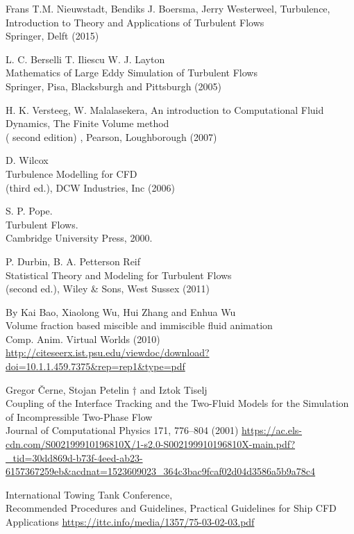 \documentclass[a4paper, 12pt]{report}
\begin{document}
\begin{thebibliography}{9}
	Frans T.M. Nieuwstadt, Bendiks J. Boersma, Jerry Westerweel,
	Turbulence, Introduction to Theory and Applications
of Turbulent Flows \\
	 Springer, Delft (2015)
	 
     L. C. Berselli T. Iliescu W. J. Layton\\	 
	 Mathematics of Large Eddy Simulation of Turbulent Flows \\
	 Springer, Pisa, Blacksburgh and Pittsburgh (2005)	 
	 
	H. K. Versteeg, W. Malalasekera, An introduction to Computational Fluid Dynamics, The Finite Volume method\\
	 ( second edition) , Pearson, Loughborough (2007)
	 
	 D. Wilcox\\
	 Turbulence Modelling for CFD\\
	(third ed.), DCW Industries, Inc (2006)
	
	S. P. Pope.\\
	Turbulent Flows.\\
	Cambridge University Press, 2000.

	 P. Durbin, B. A. Petterson Reif\\
	 Statistical Theory and Modeling for Turbulent Flows\\
	(second ed.), Wiley \& Sons, West Sussex (2011)
	
	By Kai Bao, Xiaolong Wu, Hui Zhang and Enhua Wu\\
	Volume fraction based miscible and immiscible fluid animation\\
	Comp. Anim. Virtual Worlds (2010)
	\url{http://citeseerx.ist.psu.edu/viewdoc/download?doi=10.1.1.459.7375&rep=rep1&type=pdf}
	
	Gregor Černe, Stojan Petelin † and Iztok Tiselj\\
	Coupling of the Interface Tracking and the Two-Fluid Models 		for the Simulation of Incompressible Two-Phase Flow\\
	Journal of Computational Physics 171, 776–804 (2001)
	\url{https://ac.els-cdn.com/S002199910196810X/1-s2.0-S002199910196810X-main.pdf?_tid=30dd869d-b73f-4eed-ab23-6157367259eb&acdnat=1523609023_364c3bac9fcaf02d04d3586a5b9a78c4}
	
	International Towing Tank Conference,\\
	Recommended Procedures and Guidelines, Practical Guidelines for Ship CFD Applications
	\url{https://ittc.info/media/1357/75-03-02-03.pdf}
	

\end{thebibliography}
\end{document}
